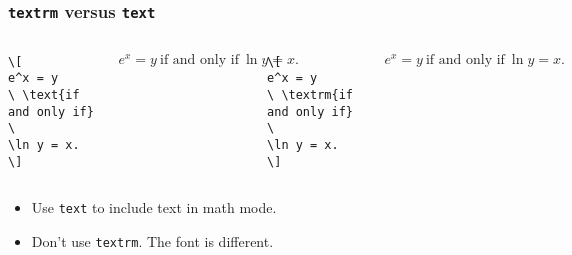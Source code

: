 \begin{frame}[fragile]
\frametitle{\texttt{textrm} versus \texttt{text}}
\begin{columns}[t]
\begin{verbatim}
\[
e^x = y 
\ \text{if and only if} \ 
\ln y = x.
\]
\end{verbatim}
\begin{example}[GOOD]
\abovedisplayskip=0pt
\[
e^x = y 
\ \text{if and only if} \ 
\ln y = x.
\]
\end{example}
\begin{verbatim}
\[
e^x = y 
\ \textrm{if and only if} \ 
\ln y = x.
\]
\end{verbatim}
\begin{example}[BAD]
\abovedisplayskip=0pt
\[
e^x = y 
\ \textrm{if and only if} \ 
\ln y = x.
\]
\end{example}
\end{columns}
\begin{itemize}
\item  Use \texttt{text} to include text in math mode.
\item  Don't use \texttt{textrm}.  The font is different.  
\end{itemize}
\end{frame}
